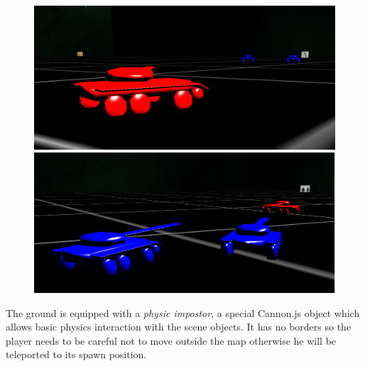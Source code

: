 \documentclass[14pt]{article}
\begin{document}
\begin{figure}[H]
\begin{minipage}[t]{0.45\textwidth}
\center
\includegraphics[width=\textwidth]{images/scenario.png}
\end{minipage}
\hfill
\begin{minipage}[t]{0.45\textwidth}
\center
\includegraphics[width=\textwidth]{images/scenario2.png}
\end{minipage}
\label{img:scenario2}
\end{figure}
The ground is equipped with a \textit{physic impostor}, a special Cannon.js object which allows basic physics interaction with the scene objects. It has no borders so the player needs to be careful not to move outside the map otherwise he will be teleported to its spawn position.
\end{document}
